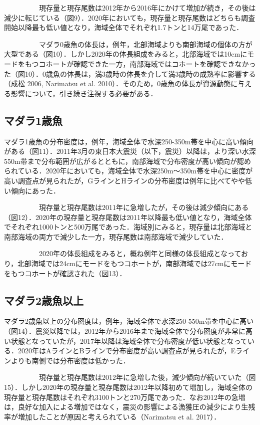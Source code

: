 \documentclass[11pt]{article} %
\begin{document}
\begin{linenumbers}
\ \ \ \ \ \ \ \ \ \ 
現存量と現存尾数は2012年から2016年にかけて増加が続き，その後は減少に転じている（図9）．2020年においても，現存量と現存尾数はどちらも調査開始以降最も低い値となり，海域全体でそれぞれ1.7トンと14万尾であった．

\ \ \ \ \ \ \ \ \ \ 
マダラ0歳魚の体長は，例年，北部海域よりも南部海域の個体の方が大型である（図10）．しかし2020年の体長組成をみると，北部海域では10cmにモードをもつコホートが確認できた一方，南部海域ではコホートを確認できなかった（図10）．0歳魚の体長は，満3歳時の体長を介して満3歳時の成熟率に影響する（成松 2006, Narimatsu et al. 2010）．そのため，0歳魚の体長が資源動態に与える影響について，引き続き注視する必要がある．


\subsection{マダラ1歳魚}
マダラ1歳魚の分布密度は，例年，海域全体で水深250-350m帯を中心に高い傾向がある（図11）．2011年3月の東日本大震災（以下，震災）以降は，より深い水深550m帯まで分布範囲が広がるとともに，南部海域で分布密度が高い傾向が認められている．2020年においても，海域全体で水深250m～350m帯を中心に密度が高い調査点が見られたが，GラインとHラインの分布密度は例年に比べてやや低い傾向にあった．

\ \ \ \ \ \ \ \ \ \ 
現存量と現存尾数は2011年に急増したが，その後は減少傾向にある（図12）．2020年の現存量と現存尾数は2011年以降最も低い値となり，海域全体でそれぞれ1000トンと500万尾であった．海域別にみると，現存量は北部海域と南部海域の両方で減少した一方，現存尾数は南部海域で減少していた．

\ \ \ \ \ \ \ \ \ \ 
2020年の体長組成をみると，概ね例年と同様の体長組成となっており，北部海域では24cmにモードをもつコホートが，南部海域では27cmにモードをもつコホートが確認された（図13）．


\subsection{マダラ2歳魚以上}
マダラ2歳魚以上の分布密度は，例年，海域全体で水深250-550m帯を中心に高い（図14）．震災以降では，2012年から2016年まで海域全体で分布密度が非常に高い状態となっていたが，2017年以降は海域全体で分布密度が低い状態となっている．2020年はAラインとBラインで分布密度が高い調査点が見られたが，Eラインよりも南側では分布密度は低かった．

\ \ \ \ \ \ \ \ \ \ 
現存量と現存尾数は2012年に急増した後，減少傾向が続いていた（図15）．しかし2020年の現存量と現存尾数は2012年以降初めて増加し，海域全体の現存量と現存尾数はそれぞれ3100トンと270万尾であった．なお2012年の急増は，良好な加入による増加ではなく，震災の影響による漁獲圧の減少により生残率が増加したことが原因と考えられている（Narimatsu et al. 2017）．


\end{linenumbers}
\end{document}
